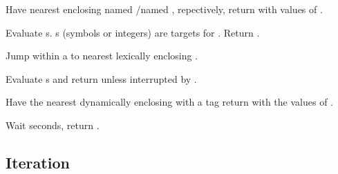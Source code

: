 \begin{LIST}{1cm}
  {
  Have nearest enclosing  named /named \NIL,
  repectively, return with values of .  
  }

  {
  Evaluate s. s (symbols or integers) are targets
  for . Return \retval{\NIL}. 
  }

  {Jump within a  to nearest
  lexically enclosing  .
  }

  {
    Evaluate s and return  unless
    interrupted by . 
  }

  {Have the nearest dynamically
  enclosing  with a tag   return with the
  values of .
  }

  {Wait  seconds, return \retval{\NIL}.
    }

\end{LIST}


\subsection{Iteration}

